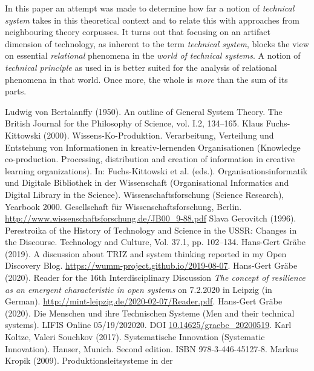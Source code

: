 \documentclass[11pt,a4paper]{article}
\begin{document}
In this paper an attempt was made to determine how far a notion of
\emph{technical system} takes in this theoretical context and to relate this
with approaches from neighbouring theory corpusses.  It turns out that
focusing on an artifact dimension of technology, as inherent to the term
\emph{technical system}, blocks the view on essential \emph{relational}
phenomena in the \emph{world of technical systems}. A notion of
\emph{technical principle} as used in \cite{Shpakovsky2010} is better suited
for the analysis of relational phenomena in that world. Once more, the whole
is \emph{more} than the sum of its parts.

\begin{thebibliography}{xxx}
 Ludwig von Bertalanffy (1950). An outline of General
  System Theory. The British Journal for the Philosophy of Science, vol. I.2,
  134–165.
 Klaus Fuchs-Kittowski (2000).  Wissens-Ko-Produktion.
  Verarbeitung, Verteilung und Entstehung von Informationen in
  kreativ-lernenden Organisationen (Knowledge co-production. Processing,
  distribution and creation of information in creative learning
  organizations). In: Fuchs-Kittowski et al. (eds.). Organisationsinformatik
  und Digitale Bibliothek in der Wissenschaft (Organisational Informatics and
  Digital Library in the Science). Wissenschaftsforschung (Science Research),
  Yearbook 2000. Gesellschaft für Wissenschaftsforschung, Berlin.\\
  \url{http://www.wissenschaftsforschung.de/JB00_9-88.pdf}
 Slava Gerovitch (1996). Perestroika of the History of
  Technology and Science in the USSR: Changes in the Discourse. Technology and
  Culture, Vol. 37.1, pp. 102--134.
 Hans-Gert Gräbe (2019). A discussion about TRIZ and
  system thinking reported in my Open Discovery Blog.
  \url{https://wumm-project.github.io/2019-08-07}. 
 Hans-Gert Gräbe (2020). Reader for the 16th
  Interdisciplinary Discussion \emph{The concept of resilience as an emergent
    characteristic in open systems} on 7.2.2020 in Leipzig (in German).
  \url{http://mint-leipzig.de/2020-02-07/Reader.pdf}.
 Hans-Gert Gräbe (2020). Die Menschen und ihre
  Technischen Systeme (Men and their technical systems). LIFIS Online
  05/19/202020.  DOI \url{10.14625/graebe_20200519}.
 Karl Koltze, Valeri Souchkov (2017). Systematische Innovation
  (Systematic Innovation). Hanser, Munich. Second edition. ISBN
  978-3-446-45127-8.
 Markus Kropik (2009). Produktionsleitsysteme in der

\end{thebibliography}
\end{document}
